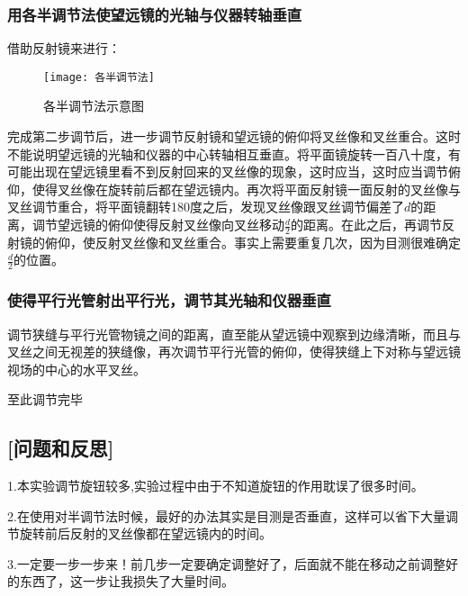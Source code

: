 \documentclass[12pt,a4paper,UTF8]{ctexart}
\begin{document}
\subsubsection*{用各半调节法使望远镜的光轴与仪器转轴垂直}
\par 借助反射镜来进行：
\begin{figure}[!htbp]
	\centering
	\texttt{[image: 各半调节法]}
	\caption{各半调节法示意图}
\end{figure}
\par 完成第二步调节后，进一步调节反射镜和望远镜的俯仰将叉丝像和叉丝重合。这时不能说明望远镜的光轴和仪器的中心转轴相互垂直。将平面镜旋转一百八十度，有可能出现在望远镜里看不到反射回来的叉丝像的现象，这时应当，这时应当调节俯仰，使得叉丝像在旋转前后都在望远镜内。再次将平面反射镜一面反射的叉丝像与叉丝调节重合，将平面镜翻转180度之后，发现叉丝像跟叉丝调节偏差了$d$的距离，调节望远镜的俯仰使得反射叉丝像向叉丝移动$\frac{d}{2}$的距离。在此之后，再调节反射镜的俯仰，使反射叉丝像和叉丝重合。事实上需要重复几次，因为目测很难确定$\frac{d}{2}$的位置。
\subsubsection*{使得平行光管射出平行光，调节其光轴和仪器垂直}
\par 调节狭缝与平行光管物镜之间的距离，直至能从望远镜中观察到边缘清晰，而且与叉丝之间无视差的狭缝像，再次调节平行光管的俯仰，使得狭缝上下对称与望远镜视场的中心的水平叉丝。

\begin{center}
	至此调节完毕
\end{center}
\subsection*{[问题和反思]}
\par 1.本实验调节旋钮较多,实验过程中由于不知道旋钮的作用耽误了很多时间。
\par 2.在使用对半调节法时候，最好的办法其实是目测是否垂直，这样可以省下大量调节旋转前后反射的叉丝像都在望远镜内的时间。
\par 3.一定要一步一步来！前几步一定要确定调整好了，后面就不能在移动之前调整好的东西了，这一步让我损失了大量时间。
\end{document}

